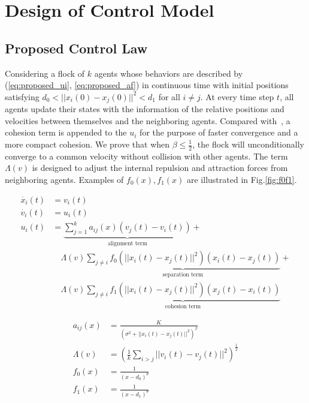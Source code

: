 \chapter{Design of Control Model}\label{design}

\section{Proposed Control Law}\label{control_law}

Considering a flock of $k$ agents whose behaviors are described by (\ref{eq:proposed_ui}, \ref{eq:proposed_af}) in continuous time with initial positions satisfying $d_0<||x_i(0)-x_j(0)||^2<d_1$ for all $i\neq j$. At every time step $t$, all agents update their states with the information of the relative positions and velocities between themselves and the neighboring agents. Compared with~\cite{CuckerDong2010}, a cohesion term is appended to the $u_i$ for the purpose of faster convergence and a more compact cohesion. We prove that when $\beta\leq\frac{1}{2}$, the flock will unconditionally converge to a common velocity without collision with other agents. The term $\Lambda(v)$ is designed to adjust the internal repulsion and attraction forces from neighboring agents. Examples of $f_0(x), f_1(x)$ are illustrated in Fig.\ref{fig:f0f1}.

\begin{equation}\label{eq:proposed_ui}
\begin{aligned}
\dot{x_i}(t)&=v_i(t)\\
\dot{v_i}(t)&=u_i(t)\\
u_i(t)&=\underbrace{\sum^k_{j=1}a_{ij}(x)(v_j(t)-v_i(t))}_{\text{alignment term}}+\\
&\quad\Lambda(v)\underbrace{\sum_{j\neq i}f_0(||x_i(t)-x_j(t)||^2)(x_i(t)-x_j(t))}_{\text{separation term}}+\\
&\quad\Lambda(v)\underbrace{\sum_{j\neq i}f_1(||x_i(t)-x_j(t)||^2)(x_j(t)-x_i(t))}_{\text{cohesion term}}
\end{aligned}
\end{equation}

\begin{equation}\label{eq:proposed_af}
\begin{aligned}
a_{ij}(x)&=\frac{K}{(\sigma^2+||x_i(t)-x_j(t)||^2)^{\beta}}\\
\Lambda(v)&=(\frac{1}{k}\sum_{i>j}||v_i(t)-v_j(t)||^2)^{\frac{1}{2}}\\
f_0(x)&=\frac{1}{(x-d_0)^{\theta}}\\
f_1(x)&=\frac{1}{(x-d_1)^{\theta}}
\end{aligned}
\end{equation}

